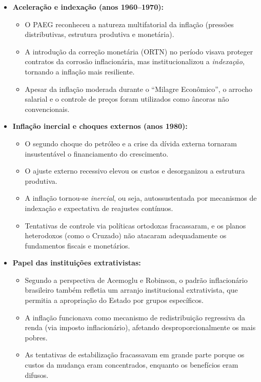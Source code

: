 \documentclass{sciposter}
\begin{document}
\begin{multicols}{3}
\begin{itemize}
    \item \textbf{ Aceleração e indexação (anos 1960–1970):}
    \begin{itemize}
        \item O PAEG reconheceu a natureza multifatorial da inflação (pressões distributivas, estrutura produtiva e monetária).
        \item A introdução da correção monetária (ORTN) no período visava proteger contratos da corrosão inflacionária, mas institucionalizou a \textit{indexação}, tornando a inflação mais resiliente.
        \item Apesar da inflação moderada durante o “Milagre Econômico”, o arrocho salarial e o controle de preços foram utilizados como âncoras não convencionais.
    \end{itemize}

    \item \textbf{ Inflação inercial e choques externos (anos 1980):}
    \begin{itemize}
        \item O segundo choque do petróleo e a crise da dívida externa tornaram insustentável o financiamento do crescimento.
        \item O ajuste externo recessivo elevou os custos e desorganizou a estrutura produtiva.
        \item A inflação tornou-se \textit{inercial}, ou seja, autossustentada por mecanismos de indexação e expectativa de reajustes contínuos.
        \item Tentativas de controle via políticas ortodoxas fracassaram, e os planos heterodoxos (como o Cruzado) não atacaram adequadamente os fundamentos fiscais e monetários.
    \end{itemize}

    \item \textbf{ Papel das instituições extrativistas:}
    \begin{itemize}
        \item Segundo a perspectiva de Acemoglu e Robinson, o padrão inflacionário brasileiro também refletia um arranjo institucional extrativista, que permitia a apropriação do Estado por grupos específicos.
        \item A inflação funcionava como mecanismo de redistribuição regressiva da renda (via imposto inflacionário), afetando desproporcionalmente os mais pobres.
        \item As tentativas de estabilização fracassavam em grande parte porque os custos da mudança eram concentrados, enquanto os benefícios eram difusos.
    \end{itemize}


\end{itemize}
\end{multicols}
\end{document}
